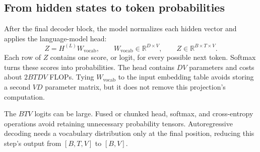 \subsection{From hidden states to token probabilities}

After the final decoder block, the model normalizes each hidden vector and applies the
language-model head:
\begin{equation}
  Z=H^{(L)}W_{\mathrm{vocab}},
  \qquad W_{\mathrm{vocab}}\in\mathbb{R}^{D\times V},
  \qquad Z\in\mathbb{R}^{B\times T\times V}.
\end{equation}
Each row of $Z$ contains one score, or logit, for every possible next token. Softmax turns
these scores into probabilities. The head contains $DV$ parameters and costs about
$2BTDV$ FLOPs. Tying $W_{\mathrm{vocab}}$ to the input embedding table avoids storing a
second $VD$ parameter matrix, but it does not remove this projection's computation.

The $BTV$ logits can be large. Fused or chunked head, softmax, and cross-entropy operations
avoid retaining unnecessary probability tensors. Autoregressive decoding needs a
vocabulary distribution only at the final position, reducing this step's output from
$[B,T,V]$ to $[B,V]$.
